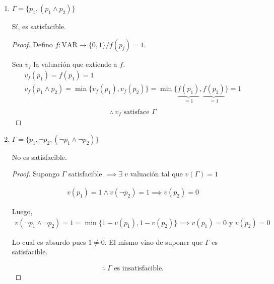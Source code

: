\begin{enumerate}
    \item $\Gamma = \{ p_1, (p_1 \wedge p_2) \}$

        Sí, es satisfacible.

        \begin{proof} \phantom{.}

        Defino $f:\mathrm{VAR}\to \{ 0,1 \} / f(p_j)=1$. 

        Sea $v_f$ la valuación que extiende a $f$.
        \begin{gather*}
            v_f(p_1) = f(p_1) = 1 \\
            v_f(p_1 \wedge p_2) = \min \{ v_f (p_1), v_f(p_2) \} =
            \min \{\underbrace{f(p_1)}_{=1}, \underbrace{f(p_2)}_{=1}\} = 1 \\
        \end{gather*}
        \begin{gather*}
            \boxed{\therefore ~ v_f \text{ satisface } \Gamma}
        \end{gather*}

        \end{proof}

    \item $\Gamma = \{ p_1, \neg p_2, (\neg p_1 \wedge \neg p_2) \}$

        No es satisfacible.

        \begin{proof} \phantom{.}

        Supongo $\Gamma$ satisfacible $\implies \exists \; v$ valuación tal
        que $v(\Gamma)=1$

        \begin{gather*}
            v(p_1) = 1 \wedge v(\neg p_2) = 1
            \implies v(p_2)=0
        \end{gather*}

        Luego,
        \begin{gather*}
            v(\neg p_1 \wedge \neg p_2) = 1 = \min \{ 1-v(p_1),1-v(p_2) \}
            \implies v(p_1)=0 \text{ y } v(p_2)=0
        \end{gather*}

        Lo cual es absurdo pues $1 \neq 0$. El mismo vino de suponer que 
        $\Gamma$ es satisfacible.

        \begin{gather*}
            \boxed{\therefore ~ \Gamma \text{ es insatisfacible.}}
        \end{gather*}


\end{proof}
\end{enumerate}

